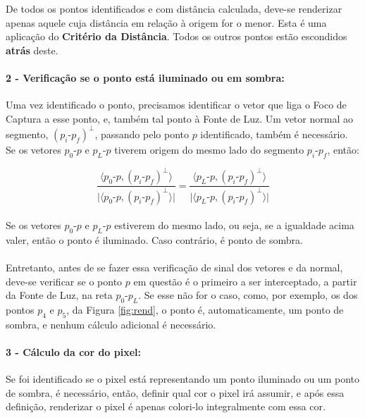 \documentclass{article}
\begin{document}
	De todos os pontos identificados e com distância calculada, deve-se renderizar apenas aquele cuja distância em relação à origem for o menor. Esta é uma aplicação do \textbf{Critério da Distância}. Todos os outros pontos estão escondidos \textbf{atrás} deste.
	
	\paragraph{2 - Verificação se o ponto está iluminado ou em sombra:}
	Uma vez identificado o ponto, precisamos identificar o vetor que liga o Foco de Captura a esse ponto, e, também tal ponto à Fonte de Luz. Um vetor normal ao segmento,  $(p_i\text{-}p_f)^\bot$, passando pelo ponto $p$ identificado, também é necessário. Se os vetores $p_0$-$p$ e $p_{L}$-$p$ tiverem origem do mesmo lado do segmento $p_i$-$p_f$, então:
	
	$$\frac{\langle p_0\text{-}p , (p_i\text{-}p_f)^\bot \rangle}{\lvert \langle p_0\text{-}p , (p_i\text{-}p_f)^\bot \rangle \rvert} = \frac{\langle p_L\text{-}p , (p_i\text{-}p_f)^\bot \rangle}{\lvert \langle p_L\text{-}p , (p_i\text{-}p_f)^\bot \rangle \rvert}$$
	
	\paragraph{}
	Se os vetores $p_0\text{-}p$ e $p_L\text{-}p$ estiverem do mesmo lado, ou seja, se a igualdade acima valer, então o ponto é iluminado. Caso contrário, é ponto de sombra.
	
	\paragraph{}
	Entretanto, antes de se fazer essa verificação de sinal dos vetores e da normal, deve-se verificar se o ponto $p$ em questão é o primeiro a ser interceptado, a partir da Fonte de Luz, na reta $p_0$-$p_L$. Se esse não for o caso, como, por exemplo, os dos pontos $p_4$ e $p_5$, da Figura \ref{fig:rend}, o ponto é, automaticamente, um ponto de sombra, e nenhum cálculo adicional é necessário.
	
	\paragraph{3 - Cálculo da cor do pixel: }
	Se foi identificado se o pixel está representando um ponto iluminado ou um ponto de sombra, é necessário, então, definir qual cor o pixel irá assumir, e após essa definição, renderizar o pixel é apenas colori-lo integralmente com essa cor.
	
\end{document}
